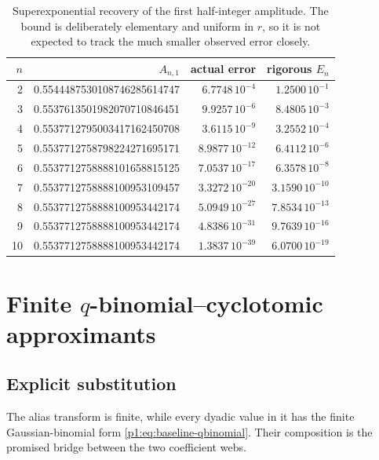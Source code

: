 \documentclass[11pt,oneside]{article}
\theoremstyle{definition}
\theoremstyle{remark}
\begin{document}
\begin{table}[ht]
\centering\small
\begin{tabular}{@{}r r r r@{}}
\toprule
$n$ & $A_{n,1}$ & actual error & rigorous $E_n$ \\
\midrule
2 & 0.5544487530108746285614747 & $6.7748\,10^{-4}$ & $1.2500\,10^{-1}$ \\
3 & 0.5537613501982070710846451 & $9.9257\,10^{-6}$ & $8.4805\,10^{-3}$ \\
4 & 0.5537712795003417162450708 & $3.6115\,10^{-9}$ & $3.2552\,10^{-4}$ \\
5 & 0.5537712758798224271695171 & $8.9877\,10^{-12}$ & $6.4112\,10^{-6}$ \\
6 & 0.5537712758888101658815125 & $7.0537\,10^{-17}$ & $6.3578\,10^{-8}$ \\
7 & 0.5537712758888100953109457 & $3.3272\,10^{-20}$ & $3.1590\,10^{-10}$ \\
8 & 0.5537712758888100953442174 & $5.0949\,10^{-27}$ & $7.8534\,10^{-13}$ \\
9 & 0.5537712758888100953442174 & $4.8386\,10^{-31}$ & $9.7639\,10^{-16}$ \\
10& 0.5537712758888100953442174 & $1.3837\,10^{-39}$ & $6.0700\,10^{-19}$ \\
\bottomrule
\end{tabular}
\caption{Superexponential recovery of the first half-integer amplitude.  The
bound is deliberately elementary and uniform in $r$, so it is not expected to
track the much smaller observed error closely.}
\label{p1:tab:A-convergence}
\end{table}

\section{Finite \texorpdfstring{$q$}{q}-binomial--cyclotomic approximants}\label{p1:sec:q-approximants}

\subsection{Explicit substitution}

The alias transform is finite, while every dyadic value in it has the finite
Gaussian-binomial form \eqref{p1:eq:baseline-qbinomial}.  Their composition is the
promised bridge between the two coefficient webs.
\end{document}
